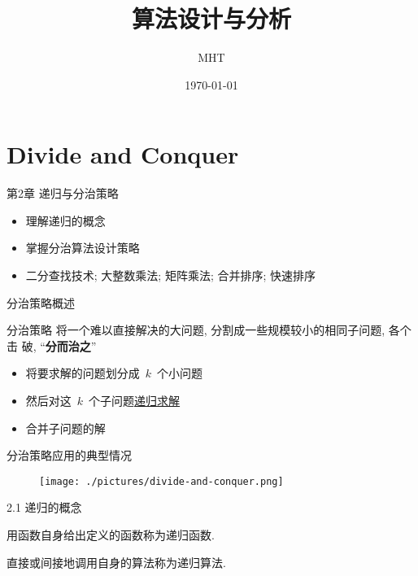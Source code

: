 \documentclass[fontset=fandol,UTF8,fleqn]{beamer}
\title{{算法设计与分析}}
\author{MHT}
\institute[Northeastern University at Qinhuangdao]{ }
\date{\today}
\begin{document}
\begin{frame}
  \titlepage
\end{frame}

\section{Divide and Conquer}

\begin{frame}{第2章 递归与分治策略}
\begin{itemize}[<+-|alert@+>]
\item 理解递归的概念
\item 掌握分治算法设计策略
\item 二分查找技术; 大整数乘法; 矩阵乘法; 合并排序;  快速排序 
\end{itemize}
\end{frame}

\begin{frame}{分治策略概述}
  \begin{exampleblock}{分治策略}
    将一个难以直接解决的大问题, 分割成一些规模较小的相同子问题, 各个击
    破, ``\textbf{分而治之}'' 
  \end{exampleblock}

 \begin{itemize}[<+-|alert@+>]
  \item 将要求解的问题划分成~$k$~个小问题
  \item 然后对这~$k$~个子问题\underline{递归求解}
  \item 合并子问题的解
\end{itemize}
\end{frame}

\begin{frame}{分治策略应用的典型情况}
\begin{figure}
  \centering
  \texttt{[image: ./pictures/divide-and-conquer.png]}%
  \label{fig:dcm}
\end{figure}
\end{frame}

\begin{frame}{2.1 递归的概念}
\begin{definition}[递归函数]
  用函数自身给出定义的函数称为递归函数.  
\end{definition}
\begin{definition}[递归算法]
直接或间接地调用自身的算法称为递归算法.  
\end{definition}
\end{frame}
\end{document}
